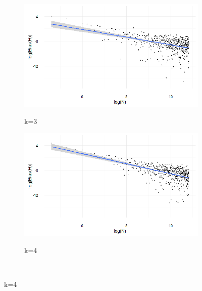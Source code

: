\documentclass{report}
\begin{document}
\begin{figure}
{\begin{subfigure}[b]{.8\textwidth}
\centering
\includegraphics[width=\textwidth]{./Graphs/Best/Normal_k=3.png}\label{normal_k=3}
\caption{k=3}
\end{subfigure}%
\begin{subfigure}[b]{.8\textwidth}
\centering
\includegraphics[width=\textwidth]{./Graphs/Best/Normal_k=4.png}\label{normal_k=4}
\caption{k=4}
\end{subfigure}%
}\    
\end{figure}
\end{document}
